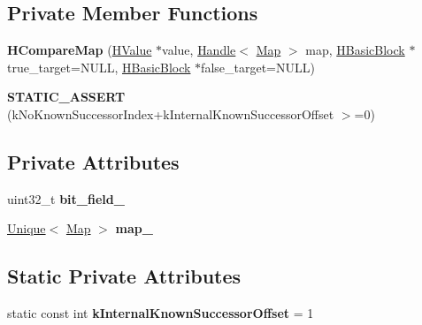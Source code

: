 \subsection*{Private Member Functions}
\begin{DoxyCompactItemize}
\item 
{\bfseries H\+Compare\+Map} (\hyperlink{classv8_1_1internal_1_1_h_value}{H\+Value} $\ast$value, \hyperlink{classv8_1_1internal_1_1_handle}{Handle}$<$ \hyperlink{classv8_1_1internal_1_1_map}{Map} $>$ map, \hyperlink{classv8_1_1internal_1_1_h_basic_block}{H\+Basic\+Block} $\ast$true\+\_\+target=N\+U\+LL, \hyperlink{classv8_1_1internal_1_1_h_basic_block}{H\+Basic\+Block} $\ast$false\+\_\+target=N\+U\+LL)\hypertarget{classv8_1_1internal_1_1_h_compare_map_a5ad6dd8a7f032b6b8fb8895bd80af188}{}\label{classv8_1_1internal_1_1_h_compare_map_a5ad6dd8a7f032b6b8fb8895bd80af188}

\item 
{\bfseries S\+T\+A\+T\+I\+C\+\_\+\+A\+S\+S\+E\+RT} (k\+No\+Known\+Successor\+Index+k\+Internal\+Known\+Successor\+Offset $>$=0)\hypertarget{classv8_1_1internal_1_1_h_compare_map_a0108034c798f96095b55593a86fb9348}{}\label{classv8_1_1internal_1_1_h_compare_map_a0108034c798f96095b55593a86fb9348}

\end{DoxyCompactItemize}
\subsection*{Private Attributes}
\begin{DoxyCompactItemize}
\item 
uint32\+\_\+t {\bfseries bit\+\_\+field\+\_\+}\hypertarget{classv8_1_1internal_1_1_h_compare_map_ac465f2f474a5ae36c753c8ffae885d9f}{}\label{classv8_1_1internal_1_1_h_compare_map_ac465f2f474a5ae36c753c8ffae885d9f}

\item 
\hyperlink{classv8_1_1internal_1_1_unique}{Unique}$<$ \hyperlink{classv8_1_1internal_1_1_map}{Map} $>$ {\bfseries map\+\_\+}\hypertarget{classv8_1_1internal_1_1_h_compare_map_ab11bdeb5322ed329a47c6e821bbc4e98}{}\label{classv8_1_1internal_1_1_h_compare_map_ab11bdeb5322ed329a47c6e821bbc4e98}

\end{DoxyCompactItemize}
\subsection*{Static Private Attributes}
\begin{DoxyCompactItemize}
\item 
static const int {\bfseries k\+Internal\+Known\+Successor\+Offset} = 1\hypertarget{classv8_1_1internal_1_1_h_compare_map_a359308b689c10fe4c0591917af531b68}{}\label{classv8_1_1internal_1_1_h_compare_map_a359308b689c10fe4c0591917af531b68}

\end{DoxyCompactItemize}
